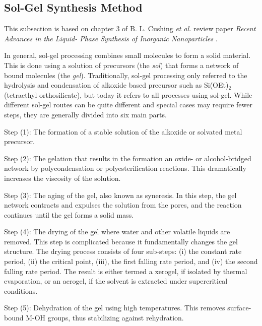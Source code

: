 \subsection{Sol-Gel Synthesis Method}
\noindent This subsection is based on chapter 3 of B. L. Cushing \textit{et al.} review paper \textit{Recent Advances in the Liquid- Phase Synthesis of Inorganic Nanoparticles} \cite{solgel_review}.

In general, sol-gel processing combines small molecules to form a solid material.
This is done using a solution of precursors (the \textit{sol}) that forms a network of bound molecules (the \textit{gel}).
Traditionally, sol-gel processing only referred to the hydrolysis and condensation of alkoxide based precursor such as Si(OEt)$_2$ (tetraethyl orthosilicate), but today it refers to all processes using sol-gel.
While different sol-gel routes can be quite different and special cases may require fewer steps, they are generally divided into six main parts.

Step (1): The formation of a stable solution of the alkoxide or solvated metal precursor.

Step (2): The gelation that results in the formation  an oxide- or alcohol-bridged network by polycondensation or polyesterification reactions.
This dramatically increases the viscosity of the solution.

Step (3):  The aging of the gel, also known as syneresis.
In this step, the gel network contracts and expulses the solution from the pores, and the reaction continues until the gel forms a solid mass.

Step (4): The drying of the gel where water and other volatile liquids are removed.
This step is complicated because it fundamentally changes the gel structure.
The drying process consists of four sub-steps: (i) the constant rate period, (ii) the critical point, (iii), the first falling rate period, and (iv) the second falling rate period.
The result is either termed a xerogel, if isolated by thermal evaporation, or an aerogel, if the solvent is extracted under supercritical conditions.

Step (5): Dehydration of the gel using high temperatures.
This removes surface-bound M-OH groups, thus stabilizing against rehydration.

